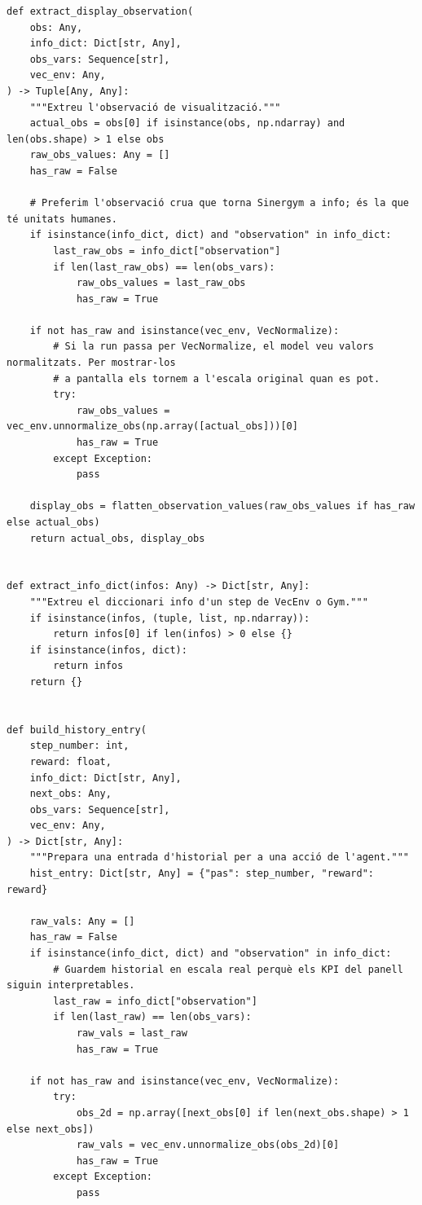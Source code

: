 \documentclass[10pt,a4paper]{article}
\begin{document}
\begin{lstlisting}[style=studioPython,caption={backend/interaccionar\_agent\_backend.py},label={lst:backend-interaccionar-agent-backend-py}]
def extract_display_observation(
    obs: Any,
    info_dict: Dict[str, Any],
    obs_vars: Sequence[str],
    vec_env: Any,
) -> Tuple[Any, Any]:
    """Extreu l'observació de visualització."""
    actual_obs = obs[0] if isinstance(obs, np.ndarray) and len(obs.shape) > 1 else obs
    raw_obs_values: Any = []
    has_raw = False

    # Preferim l'observació crua que torna Sinergym a info; és la que té unitats humanes.
    if isinstance(info_dict, dict) and "observation" in info_dict:
        last_raw_obs = info_dict["observation"]
        if len(last_raw_obs) == len(obs_vars):
            raw_obs_values = last_raw_obs
            has_raw = True

    if not has_raw and isinstance(vec_env, VecNormalize):
        # Si la run passa per VecNormalize, el model veu valors normalitzats. Per mostrar-los
        # a pantalla els tornem a l'escala original quan es pot.
        try:
            raw_obs_values = vec_env.unnormalize_obs(np.array([actual_obs]))[0]
            has_raw = True
        except Exception:
            pass

    display_obs = flatten_observation_values(raw_obs_values if has_raw else actual_obs)
    return actual_obs, display_obs


def extract_info_dict(infos: Any) -> Dict[str, Any]:
    """Extreu el diccionari info d'un step de VecEnv o Gym."""
    if isinstance(infos, (tuple, list, np.ndarray)):
        return infos[0] if len(infos) > 0 else {}
    if isinstance(infos, dict):
        return infos
    return {}


def build_history_entry(
    step_number: int,
    reward: float,
    info_dict: Dict[str, Any],
    next_obs: Any,
    obs_vars: Sequence[str],
    vec_env: Any,
) -> Dict[str, Any]:
    """Prepara una entrada d'historial per a una acció de l'agent."""
    hist_entry: Dict[str, Any] = {"pas": step_number, "reward": reward}

    raw_vals: Any = []
    has_raw = False
    if isinstance(info_dict, dict) and "observation" in info_dict:
        # Guardem historial en escala real perquè els KPI del panell siguin interpretables.
        last_raw = info_dict["observation"]
        if len(last_raw) == len(obs_vars):
            raw_vals = last_raw
            has_raw = True

    if not has_raw and isinstance(vec_env, VecNormalize):
        try:
            obs_2d = np.array([next_obs[0] if len(next_obs.shape) > 1 else next_obs])
            raw_vals = vec_env.unnormalize_obs(obs_2d)[0]
            has_raw = True
        except Exception:
            pass


\end{lstlisting}
\end{document}
